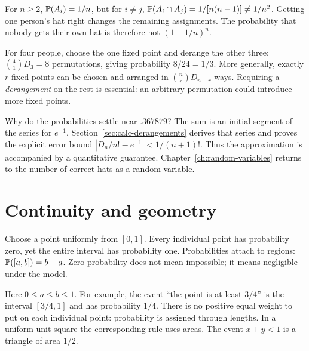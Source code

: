 \begin{warningbox}
For $n\ge2$, $\P(A_i)=1/n$, but for $i\ne j$,
$\P(A_i\cap A_j)=1/[n(n-1)]\ne1/n^2$.
Getting one person's hat right changes the remaining assignments.
The probability that nobody gets their own hat is therefore not
$(1-1/n)^n$.
\end{warningbox}

\begin{example}
For four people, choose the one fixed point and derange the other three:
$\binom41D_3=8$ permutations, giving probability $8/24=1/3$.
More generally, exactly $r$ fixed points can be chosen and arranged in
$\binom nrD_{n-r}$ ways. Requiring a \emph{derangement} on the rest is
essential: an arbitrary permutation could introduce more fixed points.
\end{example}

Why do the probabilities settle near $.367879$? The sum is an initial
segment of the series for $e^{-1}$. Section~\ref{sec:calc-derangements}
derives that series and proves the explicit error bound
$|D_n/n!-e^{-1}|<1/(n+1)!$. Thus the approximation is accompanied by
a quantitative guarantee. Chapter~\ref{ch:random-variables} returns to
the number of correct hats as a random variable.

\section{Continuity and geometry}

Choose a point uniformly from $[0,1]$. Every individual point has probability zero, yet the entire interval has probability one. Probabilities attach to regions: $\P([a,b])=b-a$. Zero probability does not mean impossible; it means negligible under the model.

Here $0\le a\le b\le1$. For example, the event ``the point is at least
$3/4$'' is the interval $[3/4,1]$ and has probability $1/4$.
There is no positive equal weight to put on each individual point:
probability is assigned through lengths. In a uniform unit square the
corresponding rule uses areas. The event $x+y<1$ is a triangle of area
$1/2$.

\begin{center}
\end{center}

